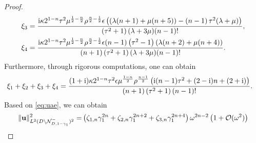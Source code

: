 \documentclass[10pt,a4paper]{amsart}
\newcommand{\bu}{\mathbf{u}}
\newcommand{\bx}{\mathbf{x}}
\begin{document}
\begin{proof}
\begin{align}
		\xi _3&=\frac{\mathrm{i}\kappa 2^{1-n} \tau ^2 \mu ^{\frac{1}{2}-\frac{n}{2}} \rho ^{\frac{n}{2}-\frac{1}{2}}\epsilon \left( (\lambda  (n+1)+\mu  (n+5))-\left(n-1\right) \tau ^2 (\lambda +\mu )\right)}{ \left(\tau ^2+1\right) (\lambda +3 \mu ) (n-1)!},\notag\\
		\xi _4&=\frac{\mathrm{i} \kappa 2^{1-n} \tau ^2  \mu ^{\frac{1}{2}-\frac{n}{2}} \rho ^{\frac{n}{2}-\frac{1}{2}} \epsilon (n-1)\left(\tau ^2-1\right)(\lambda  (n+2)+\mu  (n+4))}{(n+1) \left(\tau ^2+1\right) (\lambda +3 \mu )  (n-1)!}.\notag
	\end{align}
	Furthermore, through rigorous computations, one can obtain
	\begin{align}
		\xi _1&+\xi _2+\xi _3+\xi _4=\frac{(1+\mathrm{i}) \kappa 2^{1-n} \tau ^2 \epsilon  \mu ^{\frac{1-n}{2}} \rho ^{\frac{n-1}{2}} \left(\mathrm{i} (n-1) \tau ^2+(2-\mathrm{i}) n+(2+\mathrm{i})\right)}{(n+1) \left(\tau ^2+1\right)  (n-1)!}.\notag
	\end{align}		
	Based on \eqref{eq:uae}, we can obtain 
	\begin{align}
		\|\bu\|_{L^2(D \setminus \mathcal{N}_{D,1-\gamma_{1}}^{-})^2}^2
		=&\left(\zeta _{1,n} \gamma_1 ^{2n}+\zeta _{2,n} \gamma_1 ^{2n+2}+\zeta _{3,n} \gamma_1 ^{2n+4}\right)\omega ^{2n-2}\left(1+\mathcal{O}(\omega^{2})\right)\notag\\

\end{align}
\end{proof}
\end{document}
